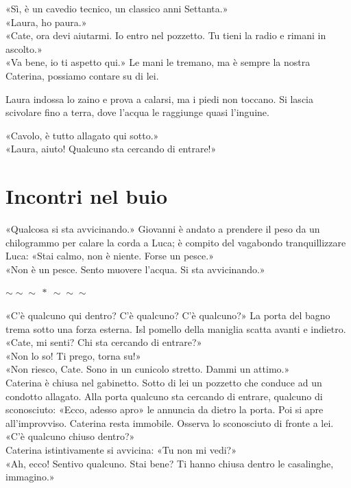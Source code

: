 \documentclass[10pt,oneside]{extbook}
\newcommand{\separatore}{\par
  \begin{center}
    {\Large $\sim\!\!\sim\!\!\sim\ \ast\ \sim\!\!\sim\!\!\sim$}
  \end{center}
  \par
}
\begin{document}
\par\medskip
«Sì, \`e un cavedio tecnico, un classico anni Settanta.»\\
«Laura, ho paura.»\\
«Cate, ora devi aiutarmi. Io entro nel pozzetto. Tu tieni la radio e rimani in ascolto.»\\
«Va bene, io ti aspetto qui.» Le mani le tremano, ma \`e sempre la nostra Caterina, possiamo contare su di lei.

\par\medskip
Laura indossa lo zaino e prova a calarsi, ma i piedi non toccano.  
Si lascia scivolare fino a terra, dove l’acqua le raggiunge quasi l’inguine.

\par\medskip
«Cavolo, \`e tutto allagato qui sotto.»\\
«Laura, aiuto! Qualcuno sta cercando di entrare!»
\clearpage{}
\clearpage{}\chapter{Incontri nel buio}

«Qualcosa si sta avvicinando.» Giovanni \`e andato a prendere il peso da un chilogrammo per calare la corda a Luca; \`e compito del vagabondo tranquillizzare Luca:
«Stai calmo, non \`e niente. Forse un pesce.»\\
«Non \`e un pesce. Sento muovere l’acqua. Si sta avvicinando.»

\separatore
\par\medskip

«C’\`e qualcuno qui dentro? C’\`e qualcuno? C’\`e qualcuno?»
La porta del bagno trema sotto una forza esterna. Isl pomello della maniglia scatta avanti e indietro.\\
«Cate, mi senti? Chi sta cercando di entrare?»\\
«Non lo so! Ti prego, torna su!»\\
«Non riesco, Cate. Sono in un cunicolo stretto. Dammi un attimo.»\\
Caterina \`e chiusa nel gabinetto. Sotto di lei un pozzetto che conduce ad un condotto allagato. Alla porta qualcuno sta cercando di entrare, qualcuno di sconosciuto:
«Ecco, adesso apro» le annuncia da dietro la porta.
Poi si apre all’improvviso. Caterina resta immobile.
Osserva lo sconosciuto di fronte a lei.\\
«C’\`e qualcuno chiuso dentro?»\\
Caterina istintivamente si avvicina: «Tu non mi vedi?»\\
«Ah, ecco! Sentivo qualcuno. Stai bene? Ti hanno chiusa dentro le casalinghe, immagino.»
\end{document}

